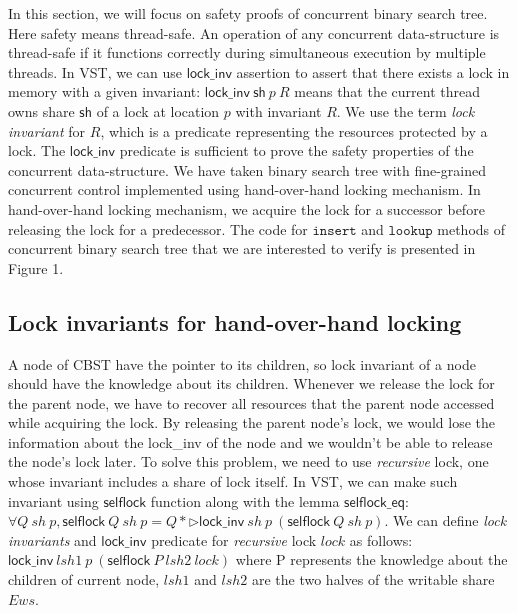 \documentclass[acmsmall,screen]{acmart}\settopmatter{printfolios=true}
\begin{document}
In this section, we will focus on safety proofs of concurrent binary search tree. Here safety means thread-safe. An operation of any concurrent data-structure is thread-safe if it functions correctly during simultaneous execution by multiple threads. In VST, we can use $\mathsf{lock\_inv}$ assertion to assert that there exists a lock in memory with a given invariant: $\mathsf{lock\_inv}\ \mathsf{sh}\ p\ R$ means that the current thread owns share $\mathsf{sh}$ of a lock at location $p$ with invariant $R$. We use the term \emph{lock invariant} for $R$, which is a predicate representing the resources protected by a lock. The $\mathsf{lock\_inv}$ predicate is sufficient to prove the safety properties of the concurrent data-structure. We have taken binary search tree with fine-grained concurrent control implemented using hand-over-hand locking mechanism. In hand-over-hand locking mechanism, we acquire the lock for a successor before releasing the lock for a predecessor. The code for $\texttt{insert}$ and $\texttt{lookup}$ methods of concurrent binary search tree that we are interested to verify is presented in Figure 1. 
   
\subsection{Lock invariants for hand-over-hand locking}
A node of CBST have the pointer to its children, so lock invariant of a node should have the knowledge about its children.   
Whenever we release the lock for the parent node, we have to recover all resources that the parent node accessed while acquiring the lock. By releasing the parent node's lock, we would lose the information about the lock\_inv of the node and we wouldn't be able to release the node's lock later. To solve this problem, we need to use \emph{recursive} lock, one whose invariant includes a share of lock itself. In VST, we can make such invariant using $\mathsf{selflock}$ function along with the lemma $\mathsf{selflock\_eq}$: $\forall Q\ \mathit{sh}\ p, \mathsf{selflock}\ Q\ \mathit{sh}\ p = Q * \triangleright \mathsf{lock\_inv}\ \mathit{sh}\ p\ (\mathsf{selflock}\ Q\ \mathit{sh}\ p)$. We can define \emph{lock invariants} and $\mathsf{lock\_inv}$ predicate for \emph{recursive} lock $\mathit{lock}$ as follows: $\mathsf{lock\_inv}\ \mathit{lsh1}\ p\ (\mathsf{selflock}\ P\ \mathit{lsh2}\ \mathit{lock})$ where P represents the knowledge about the children of current node, $\mathit{lsh1}$ and $\mathit{lsh2}$ are the two halves of the writable share $\mathit{Ews}$.
\end{document}
